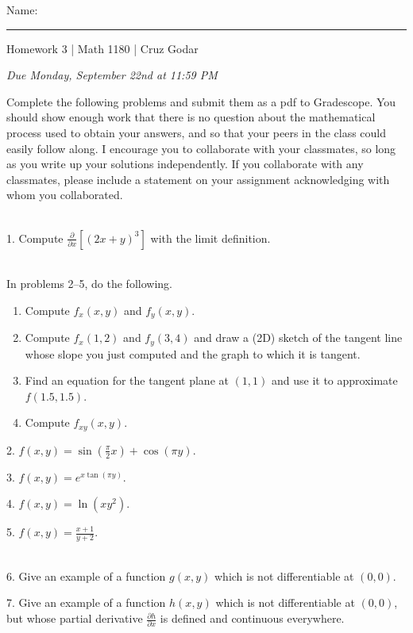 \documentclass{article}
\begin{document}
\Large Name: \rule{2in}{0.15mm} \hfill Homework 3 | Math 1180 | Cruz Godar \vspace{4pt} \normalsize

\textit{Due Monday, September 22nd at 11:59 PM}

Complete the following problems and submit them as a pdf to Gradescope. You should show enough work that there is no question about the mathematical process used to obtain your answers, and so that your peers in the class could easily follow along. I encourage you to collaborate with your classmates, so long as you write up your solutions independently. If you collaborate with any classmates, please include a statement on your assignment acknowledging with whom you collaborated.

~\\

1. Compute $\frac{\partial}{\partial x} \left[ (2x + y)^3 \right]$ with the limit definition.

~\\

In problems 2--5, do the following.

\begin{enumerate}

	\item Compute $f_x(x, y)$ and $f_y(x, y)$.

	\item Compute $f_x(1, 2)$ and $f_y(3, 4)$ and draw a (2D) sketch of the tangent line whose slope you just computed and the graph to which it is tangent.

	\item Find an equation for the tangent plane at $(1, 1)$ and use it to approximate $f(1.5, 1.5)$.

	\item Compute $f_{xy}(x, y)$.

\end{enumerate}

2. $f(x, y) = \sin\left( \frac{\pi}{2} x \right) + \cos(\pi y)$.

3. $f(x, y) = e^{x\tan(\pi y)}$.

4. $f(x, y) = \ln(xy^2)$.

5. $f(x, y) = \frac{x + 1}{y + 2}$.

~\\

6. Give an example of a function $g(x, y)$ which is not differentiable at $(0, 0)$.

7. Give an example of a function $h(x, y)$ which is not differentiable at $(0, 0)$, but whose partial derivative $\frac{\partial h}{\partial x}$ is defined and continuous everywhere.
\end{document}
